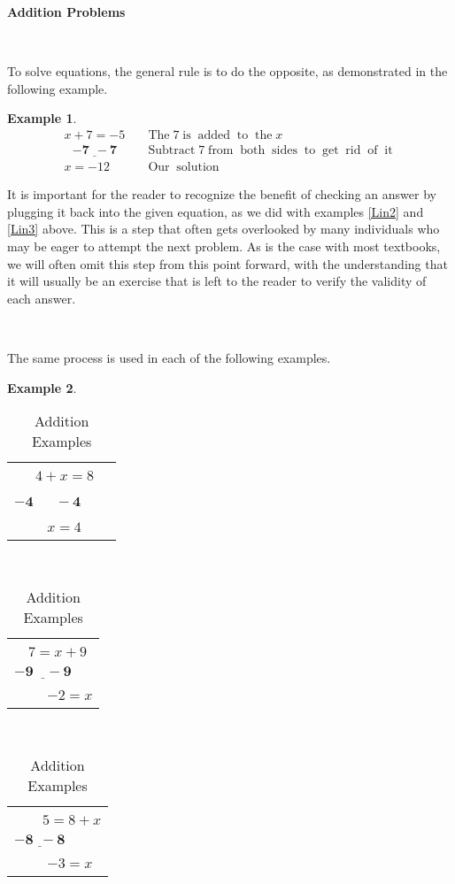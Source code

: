 \documentclass[11pt]{book}
\newcommand{\tmmathbf}[1]{\ensuremath{\boldsymbol{#1}}}
\newcommand{\tmop}[1]{\ensuremath{\operatorname{#1}}}
\theoremstyle{definition}  %
\newtheorem{example}{Example}[chapter]
\newcommand{\pp}{\par~\par}
\begin{document}
{\textbf{Addition Problems}}\par
~\par

To solve equations, the general rule is to do the opposite, as demonstrated in the following example.

\begin{example}\label{Lin4}
\begin{eqnarray*}
  x + 7 = - 5 &  & \tmop{The} 7 \tmop{is} \tmop{added} \tmop{to} \tmop{the}
  x\\
  ~~~\underline{\tmmathbf{- 7 ~~- 7}} &  & \tmop{Subtract} 7 \tmop{from}
  \tmop{both} \tmop{sides} \tmop{to} \tmop{get} \tmop{rid} \tmop{of}
  \tmop{it}\\
  x = - 12 &  & \tmop{Our} \tmop{solution}
\end{eqnarray*}
\end{example}

It is important for the reader to recognize the benefit of checking an answer by plugging it back into the given equation, as we did with examples \ref{Lin2} and \ref{Lin3} above.  This is a step that often gets overlooked by many individuals who may be eager to attempt the next problem.  As is the case with most textbooks, we will often omit this step from this point forward, with the understanding that it will usually be an exercise that is left to the reader to verify the validity of each answer.\pp

The same process is used in each of the following examples.

\pagebreak

\begin{example}\label{Lin5}
~\end{example}

	\begin{table}[h]
		\begin{tabular}{l}
    ~~~$4 + x = 8$\\
    \underline{$\ensuremath{\boldsymbol{- 4 ~~~~~~~- 4}}$}~~~~\\
    ~~~~ $x = 4$
  \end{tabular} \ \ \ \ \ \ \ \ \ \ \ \ \ \ \ \ \ \ \ \begin{tabular}{l}
    \ \ $7 = x + 9$\\
    $\tmmathbf{\underline{- 9 ~~~~- 9}}$\\
    ~~~~ $- 2 = x$
  \end{tabular} \ \ \ \ \ \ \ \ \ \ \ \ \ \ \ \ \ \ \ \begin{tabular}{l}
    \ \ ~~$5 = 8 + x$\\
    $\tmmathbf{\underline{- 8 ~~- 8}}$\\
    ~~~~ $- 3 = x$
  \end{tabular}
  \caption{Addition Examples}
	\end{table}
\end{document}
